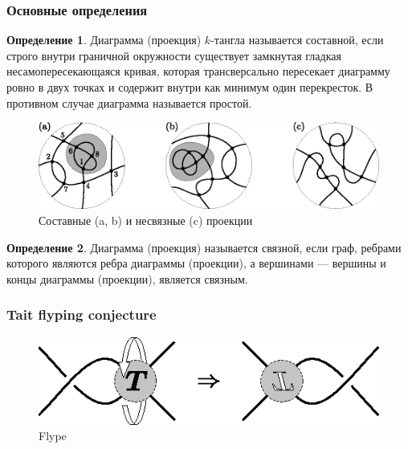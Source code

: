 \documentclass[dvips, intlimits, 9pt, unicode, notheorems]{beamer}
\theoremstyle{plain}
\theoremstyle{definition}
\newtheorem{definition}{Определение}
\begin{document}
	\begin{frame}
		\frametitle{Основные определения}

		\begin{definition}
			Диаграмма (проекция) $k$-тангла называется составной, если строго внутри граничной окружности существует замкнутая
			гладкая несамопересекающаяся кривая, которая трансверсально пересекает диаграмму ровно в двух точках и содержит
			внутри как минимум один перекресток. В противном случае диаграмма называется простой.
		\end{definition}

		\begin{figure}[H]
			\centering
			\includegraphics[scale = 0.7]{c/composite-non-connected-projections.eps}
			\caption{Составные (a, b) и несвязные (c) проекции}
		\end{figure}

		\begin{definition}
			Диаграмма (проекция) называется связной, если граф, ребрами которого являются ребра диаграммы (проекции), а
			вершинами --- вершины и концы диаграммы (проекции), является связным.
		\end{definition}
	\end{frame}

	\begin{frame}
		\frametitle{Tait flyping conjecture}

		\begin{figure}[ht]
			\centering
			\includegraphics{c/flype.eps}
			\caption{Flype}
		\end{figure}
	\end{frame}
\end{document}
